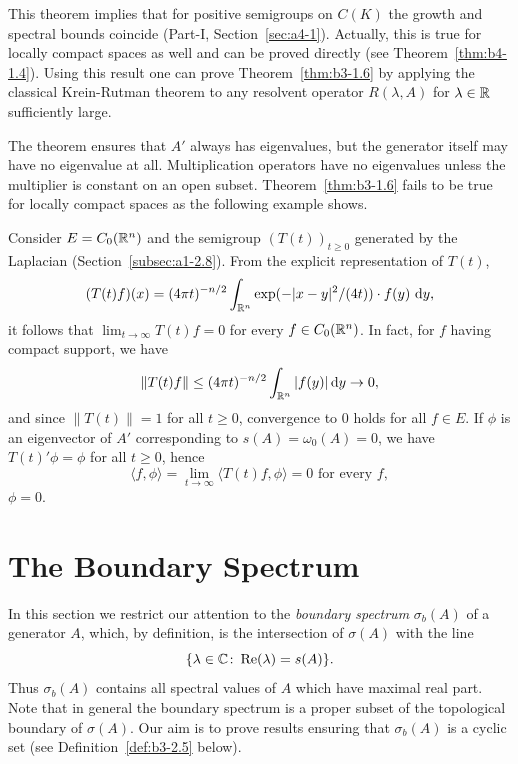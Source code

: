 This theorem implies that for positive semigroups on $C(K)$ the growth and spectral bounds coincide (\cf Part-I, Section~\ref{sec:a4-1}).
Actually, this is true for locally compact spaces as well and can be proved directly (see Theorem~\ref{thm:b4-1.4}).
Using this result one can prove Theorem~\ref{thm:b3-1.6} by applying the classical Krein-Rutman theorem to any resolvent operator $R(\lambda,A)$ for $\lambda \in \mathbb{R}$ sufficiently large.

The theorem ensures that $A'$ always has eigenvalues, but the generator itself may have no eigenvalue at all.
Multiplication operators have no eigenvalues unless the multiplier is constant on an open subset.
Theorem~\ref{thm:b3-1.6} fails to be true for locally compact spaces as the following example shows.
\begin{example}\label{ex:b3-1.7}
	Consider $E = C_{0}(\mathbb{R}^{n})$ and the semigroup $(T(t))_{t \geq 0}$ generated by the Laplacian (\cf Section~\ref{subsec:a1-2.8}).
From the explicit representation of\/ $T(t)$,
	\begin{equation}\label{eq:b3-1.17}
		(T(t)f)(x) = (4\pi t)^{-n/2}\int_{\mathbb{R}^{n}} \exp(-|x-y|^{2}/(4t))\cdot f(y) \, \mathop{}\!\mathrm{d}{y}  , 
	\end{equation}
	it follows that $\lim_{t \to \infty}T(t)f = 0$ for every $f \in C_{0}(\mathbb{R}^{n})$. In fact, for $f$ having compact support, we have     
    \[
    \|T(t)f\| \leq (4\pi t)^{-n/2}\int_{\R^{n}} |f(y)| \dy \to 0 , 
    \]
    and since $\|T(t)\| = 1$ for all $t \geq 0$, convergence to $0$ holds for all  $f\in E$.
	If\/ $\phi$ is an eigenvector of\/ $A'$ corresponding to $s(A) = \omega_{0}(A) = 0$, we have $T(t)'\phi = \phi$ for all $t \geq 0$, hence 
    \[
    \langle f,\phi \rangle = \lim_{t \to \infty}\langle T(t)f,\phi \rangle = 0 \text{ for every } f , 
    \]
    \ie $\phi = 0$.
\end{example}
\section{The Boundary Spectrum}\label{sec:b3-2}%
In this section we restrict our attention to the \emph{boundary spectrum}%
$\sigma_{b}(A)$ of a generator $A$, which, by definition, is the intersection of\/ $\sigma(A)$ with the line 
\[
\{\lambda \in \mathbb{C} \colon \mathop{}\!\mathrm{Re}(\lambda) = s(A)\} .
\]
Thus $\sigma_{b}(A)$ contains all spectral values of\/ $A$ which have maximal real part.
Note that in general the boundary spectrum is a proper subset of the topological boundary of\/ $\sigma(A)$.
Our aim is to prove results ensuring that $\sigma_{b}(A)$ is a cyclic set (see Definition~\ref{def:b3-2.5} below).

